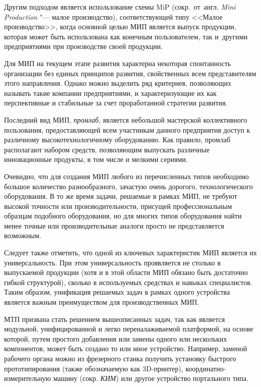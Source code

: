 Другим подходом является использование схемы MiP (сокр.~от~англ. \textit{Mini Production} "--- малое производство), соответствующей типу <<Малое производство>>, когда основной целью МИП является выпуск продукции, которая может быть использована как конечным пользователем, так и~другими предприятиями при производстве своей продукции.

Для МИП на текущем этапе развития характерна некоторая спонтанность организации без единых принципов развития, свойственных всем представителям этого направления. Однако можно выделить ряд критериев, позволяющих называть такие компании предприятиями, и характеризующие их как перспективные и стабильные за счет проработанной стратегии развития.

Последний вид МИП, \textit{промлаб}, является небольшой мастерской коллективного пользования, предоставляющей всем участникам данного предприятия доступ к различному высокотехнологичному оборудованию. Как правило, промлаб располагают набором средств, позволяющим выпускать различные инновационные продукты, в том числе и мелкими сериями. 

Очевидно, что для создания МИП любого из перечисленных типов необходимо большое количество разнообразного, зачастую очень дорогого, технологического оборудования. В то же время задачи, решаемые в рамках МИП, не требуют высокой точности или производительности, присущей профессиональным образцам подобного оборудования, но для многих типов оборудования найти менее точные или производительные аналоги просто не представляется возможным.

Следует также отметить, что одной из ключевых характеристик МИП является их универсальность. При этом универсальность проявляется не столько в выпускаемой продукции (хотя и в этой области МИП обязано быть достаточно гибкой структурой), сколько в используемых средствах и навыках специалистов. Таким образом, унификация решаемых задач в рамках одного устройства является важным преимуществом для производственных МИП.

МТП призвана стать решением вышеописанных задач, так как является модульной, унифицированной и легко переналаживаемой платформой, на основе которой, путем простого добавления или замены одного или нескольких компонентов, может быть создано то или иное устройство. Например, заменой рабочего органа можно из фрезерного станка получить установку быстрого прототипирования (также обозначаемую как 3D-принтер), координатно-измерительную машину (сокр. \textit{КИМ}) или другое устройство портального типа.

